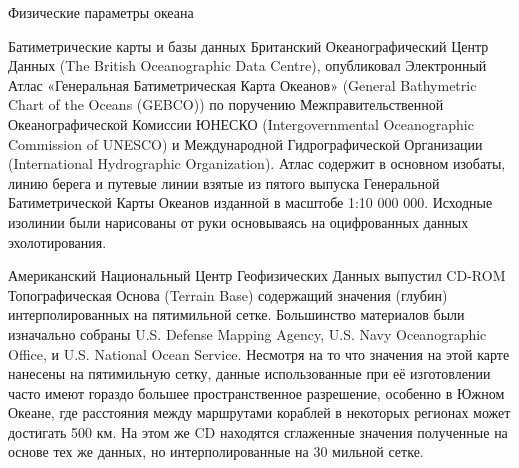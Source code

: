 \begin{chapter}{Физические параметры океана}
\begin{section}{Батиметрические карты и базы данных}
Британский Океанографический Центр Данных (The British Oceanographic
Data Centre), опубликовал Электронный Атлас «Генеральная
Батиметрическая Карта Океанов» (General Bathymetric Chart of the
Oceans (GEBCO)) по поручению Межправительственной Океанографической
Комиссии ЮНЕСКО (Intergovernmental Oceanographic Commission of UNESCO)
и Международной Гидрографической Организации (International
Hydrographic Organization). Атлас содержит в основном изобаты, линию
берега и путевые линии взятые из пятого выпуска Генеральной
Батиметрической Карты Океанов изданной в масштобе 1:10 000
000. Исходные изолинии были нарисованы от руки основываясь на
оцифрованных данных эхолотирования.
%

Американский Национальный Центр Геофизических Данных выпустил CD-ROM
Топографическая Основа (Terrain Base) содержащий значения (глубин)
интерполированных на пятимильной сетке. Большинство материалов были
изначально собраны U.S. Defense Mapping Agency, U.S. Navy
Oceanographic Office, и U.S. National Ocean Service. Несмотря на то
что значения на этой карте нанесены на пятимильную сетку, данные
использованные при её изготовлении часто имеют гораздо большее
пространственное разрешение, особенно в Южном Океане, где расстояния
между маршрутами кораблей в некоторых регионах может достигать 500
км. На этом же CD находятся сглаженные значения полученные на основе
тех же данных, но интерполированные на 30 мильной сетке.



\end{section}
\end{chapter}
